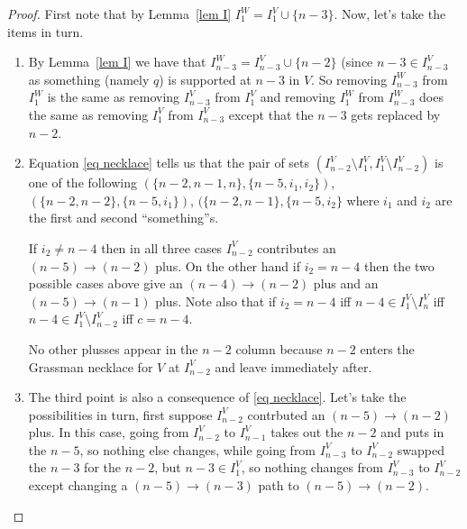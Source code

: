 \documentclass[11pt]{article}
\theoremstyle{remark}
\theoremstyle{definition}
\begin{document}
\begin{proof}

  First note that by Lemma~\ref{lem I} $I_1^W = I_1^V\cup \{n-3\}$.  Now, let's take the items in turn.

\begin{enumerate}  
  \item By Lemma~\ref{lem I} we have that $I_{n-3}^W = I_{n-3}^V \cup \{n-2\}$ (since $n-3\in I_{n-3}^V$ as something (namely $q$) is supported at $n-3$ in $V$.  So removing $I_{n-3}^W$ from $I_{1}^W$  is the same as removing $I_{n-3}^V$ from $I_1^V$ and removing $I_1^W$ from $I_{n-3}^W$ does the same as removing $I_{1}^V$ from $I_{n-3}^V$ except that the $n-3$ gets replaced by $n-2$.    
  \item Equation \eqref{eq necklace} tells us that the pair of sets $(I_{n-2}^V\setminus I_1^V, I_1^V\setminus I_{n-2}^V)$ is one of the following $(\{n-2, n-1, n\}, \{n-5, i_1, i_2\})$, $(\{n-2, n-2\}, \{n-5, i_1\})$, $(\{n-2, n-1\}, \{n-5, i_2\}$
  where $i_1$ and $i_2$ are the first and second ``something''s. 

    If $i_2\neq n-4$ then in all three cases $I_{n-2}^V$ contributes an $(n-5)\rightarrow (n-2)$ plus. On the other hand if $i_2=n-4$ then the two possible cases above give an $(n-4)\rightarrow (n-2)$ plus and an $(n-5)\rightarrow (n-1)$ plus.  Note also that if $i_2=n-4$ iff $n-4 \in I_1^V\setminus I_n^V$ iff $n-4\in I_1^V\setminus I_{n-2}^V$ iff $c=n-4$.

    No other plusses appear in the $n-2$ column because $n-2$ enters the Grassman necklace for $V$ at $I_{n-2}^V$ and leave immediately after.
  \item 
    The third point is also a consequence of \eqref{eq necklace}.  Let's take the possibilities in turn, first suppose $I_{n-2}^V$ contrbuted an $(n-5)\rightarrow (n-2)$ plus.  In this case, going from $I_{n-2}^V$ to $I_{n-1}^V$ takes out the $n-2$ and puts in the $n-5$, so  nothing else changes, while going from $I_{n-3}^V$ to $I_{n-2}^V$ swapped the $n-3$ for the $n-2$, but $n-3\in I_1^V$, so nothing changes from $I_{n-3}^V$ to $I_{n-2}^V$ except changing a $(n-5)\rightarrow (n-3)$ path to $(n-5)\rightarrow (n-2)$.


\end{enumerate}
\end{proof}
\end{document}
